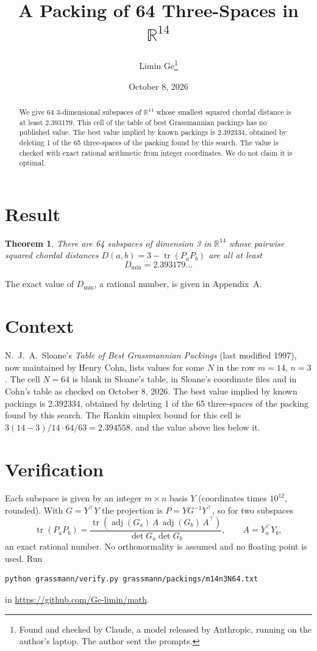 \documentclass[11pt,a4paper]{article}
\title{A Packing of 64 Three-Spaces in $\mathbb{R}^{14}$}
\author{Limin Ge\thanks{Found and checked by Claude, a model released by Anthropic, running on the author's laptop. The author sent the prompts.}}
\date{October 8, 2026}
\newtheorem*{theorem}{Theorem}
\begin{document}
\maketitle
\begin{abstract}
We give 64 3-dimensional subspaces of $\mathbb{R}^{14}$ whose smallest squared chordal distance is at least 2.393179. This cell of the table of best Grassmannian packings has no published value. The best value implied by known packings is 2.392334, obtained by deleting 1 of the 65 three-spaces of the packing found by this search. The value is checked with exact rational arithmetic from integer coordinates. We do not claim it is optimal.
\end{abstract}

\section{Result}
\begin{theorem}
There are 64 subspaces of dimension 3 in $\mathbb{R}^{14}$ whose pairwise squared chordal distances $D(a,b) = 3 - \operatorname{tr}(P_aP_b)$ are all at least
\[ D_{\min} = 2.393179\ldots \]
\end{theorem}
The exact value of $D_{\min}$, a rational number, is given in Appendix~A.


\section{Context}
N.~J.~A.~Sloane's \emph{Table of Best Grassmannian Packings} (last modified 1997), now maintained by Henry Cohn, lists values for some $N$ in the row $m=14$, $n=3$. The cell $N=64$ is blank in Sloane's table, in Sloane's coordinate files and in Cohn's table as checked on October 8, 2026. The best value implied by known packings is 2.392334, obtained by deleting 1 of the 65 three-spaces of the packing found by this search. The Rankin simplex bound for this cell is $3(14-3)/14\cdot 64/63 = 2.394558$, and the value above lies below it.


\section{Verification}
Each subspace is given by an integer $m\times n$ basis $Y$ (coordinates times $10^{12}$, rounded). With $G=Y^\top Y$ the projection is $P=YG^{-1}Y^\top$, so for two subspaces
\[ \operatorname{tr}(P_aP_b)=\frac{\operatorname{tr}(\operatorname{adj}(G_a)\,A\,\operatorname{adj}(G_b)\,A^\top)}{\det G_a\det G_b},\qquad A=Y_a^\top Y_b, \]
an exact rational number. No orthonormality is assumed and no floating point is used. Run
\begin{verbatim}
python grassmann/verify.py grassmann/packings/m14n3N64.txt
\end{verbatim}
in \url{https://github.com/Ge-limin/math}.
\end{document}
